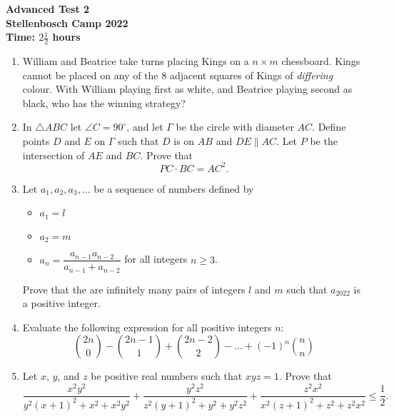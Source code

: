 \documentclass{article}
\begin{document}
\thispagestyle{empty}

\begin{center}
  \textbf{\Large Advanced Test 2}
  \\ \vspace{1em}
  \textbf{\large Stellenbosch Camp 2022}
  \\ \vspace{1em}
  \textbf{\large Time: $2\frac{1}{2}$ hours}
\end{center}

\bigskip

\vfill

\begin{enumerate}[itemsep=\fill]

\item %
William and Beatrice take turns placing Kings on a $n \times m$ chessboard.
Kings cannot be placed on any of the 8 adjacent squares of Kings of \emph{differing} colour.
With William playing first as white, and Beatrice playing second as black, who has the winning strategy?


\item %
In $\triangle ABC$ let $\angle C = 90^\circ$, and let $\Gamma$ be the circle with diameter $AC$.
Define points $D$ and $E$ on $\Gamma$ such that $D$ is on $AB$ and $DE \parallel AC$.
Let $P$ be the intersection of $AE$ and $BC$.
Prove that
\[ PC \cdot BC = AC^2. \]

\vspace{0pt}


\item %
Let $a_1, a_2, a_3, \dots$ be a sequence of numbers defined by 
\begin{itemize}
	\item $a_1 = l$
	\item $a_2 = m$
	\item $a_n = \dfrac{a_{n-1}a_{n-2}}{a_{n-1}+a_{n-2}}$ for all integers $n \geq 3$.
\end{itemize}
Prove that the are infinitely many pairs of integers $l$ and $m$ such that $a_{2022}$ is a positive integer.


\item %
Evaluate the following expression for all positive integers $n$:
\[ {2n \choose 0} -{2n-1 \choose 1}+{2n-2 \choose 2}-...+(-1)^n{n \choose n} \]

\vspace{0pt}


\item %
Let $x$, $y$, and $z$ be positive real numbers such that $xyz = 1$.
Prove that
\[ \frac{x^2y^2}{y^2(x+1)^2+x^2+x^2y^2} +\frac{y^2z^2}{z^2(y+1)^2+y^2+y^2z^2} +\frac{z^2x^2}{x^2(z+1)^2+z^2+z^2x^2} \leq \frac{1}{2}. \]

\end{enumerate}
\end{document}
